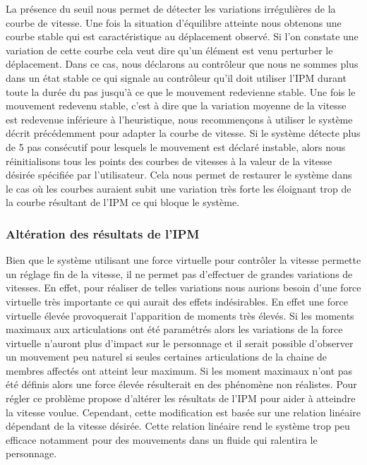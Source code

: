 \documentclass[runningheads,a4paper]{llncs}
\begin{document}
La présence du seuil nous permet de détecter les variations irrégulières de la courbe de vitesse. Une fois la situation d'équilibre atteinte nous obtenons une courbe stable qui est caractéristique au déplacement observé. Si l'on constate une variation de cette courbe cela veut dire qu'un élément est venu perturber le déplacement. Dans ce cas, nous déclarons au contrôleur que nous ne sommes plus dans un état stable ce qui signale au contrôleur qu'il doit utiliser l'IPM durant toute la durée du pas jusqu'à ce que le mouvement redevienne stable. Une fois le mouvement redevenu stable, c'est à dire que la variation moyenne de la vitesse est redevenue inférieure à l'heuristique, nous recommençons à utiliser le système décrit précédemment pour adapter la courbe de vitesse. Si le système détecte plus de 5 pas consécutif pour lesquels le mouvement est déclaré instable, alors nous réinitialisons tous les points des courbes de vitesses à la valeur de la vitesse désirée spécifiée par l'utilisateur. Cela nous permet de restaurer le système dans le cas où les courbes auraient subit une variation très forte les éloignant trop de la courbe résultant de l'IPM ce qui bloque le système.
%
\subsubsection{Altération des résultats de l'IPM}
\label{sec:ipm_alt}
%
Bien que le système utilisant une force virtuelle pour contrôler la vitesse permette un réglage fin de la vitesse, il ne permet pas d'effectuer de grandes variations de vitesses. En effet, pour réaliser de telles variations nous aurions besoin d'une force virtuelle très importante ce qui aurait des effets indésirables. En effet une force virtuelle élevée provoquerait l'apparition de moments très élevés. Si les moments maximaux aux articulations ont été  paramétrés alors les variations de la force virtuelle n'auront plus d'impact sur le personnage et il serait possible d'observer un mouvement peu naturel si seules certaines articulations de la chaine de membres affectés ont atteint leur maximum. Si les moment maximaux n'ont pas été définis alors une force élevée résulterait en des phénomène non réalistes. Pour régler ce problème \cite{coros2010generalized} propose d'altérer les résultats de l'IPM pour aider à atteindre la vitesse voulue. Cependant, cette modification est basée sur une relation linéaire dépendant de la vitesse désirée. Cette relation linéaire rend le système trop peu efficace notamment pour des mouvements dans un fluide qui ralentira le personnage.
\end{document}
